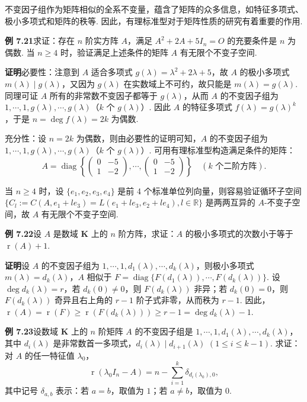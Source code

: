 \documentclass[UTF8, 12pt, fontset=fandol, oneside]{ctexart}
\begin{document}
不变因子组作为矩阵相似的全系不变量，蕴含了矩阵的众多信息，如特征多项式、极小多项式和矩阵的秩等. 因此，有理标准型对于矩阵性质的研究有着重要的作用.

\noindent\textbf{例 7.21}\quad 求证：存在 $n$ 阶实方阵 $A$，满足 $A^2+2A+5I_n=O$ 的充要条件是 $n$ 为偶数. 当 $n\ge 4$ 时，验证满足上述条件的矩阵 $A$ 有无限个不变子空间.

\noindent\textbf{证明}\quad 必要性：注意到 $A$ 适合多项式 $g(\lambda)=\lambda^2+2\lambda+5$，故 $A$ 的极小多项式 $m(\lambda)\mid g(\lambda)$，又因为 $g(\lambda)$ 在实数域上不可约，故只能是 $m(\lambda)=g(\lambda)$. 同理可证 $A$ 所有的非常数不变因子都等于 $g(\lambda)$，从而 $A$ 的不变因子组为 $1,\cdots,1,g(\lambda),\cdots,g(\lambda)$（$k$ 个 $g(\lambda)$）. 因此 $A$ 的特征多项式 $f(\lambda)=g(\lambda)^k$，于是 $n=\deg f(\lambda)=2k$ 为偶数.

充分性：设 $n=2k$ 为偶数，则由必要性的证明可知，$A$ 的不变因子组为 $1,\cdots,1,g(\lambda),\cdots,g(\lambda)$（$k$ 个 $g(\lambda)$）. 可用有理标准型构造满足条件的矩阵：
\[
A=\operatorname{diag}\left\{
\left(\begin{array}{cc}
0 & -5\\
1 & -2
\end{array}\right),
\cdots,
\left(\begin{array}{cc}
0 & -5\\
1 & -2
\end{array}\right)
\right\}
\quad(k\text{ 个二阶方阵}).
\]

当 $n\ge 4$ 时，设 $\{e_1,e_2,e_3,e_4\}$ 是前 4 个标准单位列向量，则容易验证循环子空间 $\{C_l:=C(A,e_1+le_3)=L(e_1+le_3,e_2+le_4),l\in\mathbb{R}\}$ 是两两互异的 $A$-不变子空间，故 $A$ 有无限个不变子空间.

\noindent\textbf{例 7.22}\quad 设 $A$ 是数域 $\mathbf{K}$ 上的 $n$ 阶方阵，求证：$A$ 的极小多项式的次数小于等于 $\operatorname{r}(A)+1$.

\noindent\textbf{证明}\quad 设 $A$ 的不变因子组为 $1,\cdots,1,d_1(\lambda),\cdots,d_k(\lambda)$，则极小多项式 $m(\lambda)=d_k(\lambda)$，$A$ 相似于 $F=\operatorname{diag}\{F(d_1(\lambda)),\cdots,F(d_k(\lambda))\}$. 设 $\deg d_k(\lambda)=r$，若 $d_k(0)\ne 0$，则 $F(d_k(\lambda))$ 非异；若 $d_k(0)=0$，则 $F(d_k(\lambda))$ 奇异且右上角的 $r-1$ 阶子式非零，从而秩为 $r-1$. 因此，$\operatorname{r}(A)=\operatorname{r}(F)\ge \operatorname{r}(F(d_k(\lambda)))\ge r-1=\deg d_k(\lambda)-1$.

\noindent\textbf{例 7.23}\quad 设数域 $\mathbf{K}$ 上的 $n$ 阶矩阵 $A$ 的不变因子组是 $1,\cdots,1,d_1(\lambda),\cdots,d_k(\lambda)$，其中 $d_i(\lambda)$ 是非常数首一多项式，$d_i(\lambda)\mid d_{i+1}(\lambda)$ $(1\le i\le k-1)$. 求证：对 $A$ 的任一特征值 $\lambda_0$，
\[
\operatorname{r}(\lambda_0I_n-A)=n-\sum_{i=1}^k\delta_{d_i(\lambda_0),0},
\]
其中记号 $\delta_{a,b}$ 表示：若 $a=b$，取值为 $1$；若 $a\ne b$，取值为 $0$.
\end{document}

